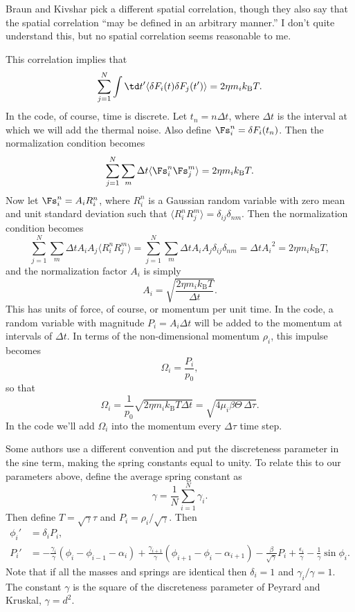 \documentclass[11pt]{article}
\begin{document}
Braun and Kivshar pick a different spatial correlation, though they also say that the spatial correlation ``may be defined in an arbitrary manner.'' I don't quite understand this, but no spatial correlation seems reasonable to me.

This correlation implies that
\[
\sum_{j=1}^N\int \td t' \langle\delta F_i(t)\delta F_j(t')\rangle
	= 2\eta m_ik_\text{B}T.
\]
In the code, of course, time is discrete. Let $t_n=n\Delta t$, where $\Delta t$ is the interval at which we will add the thermal noise. Also define $\Fs_i^n=\delta F_i(t_n)$. Then the normalization condition becomes
\[
\sum_{j=1}^N\sum_m \Delta t\langle \Fs_i^n\Fs_j^{m}\rangle = 2\eta m_ik_\text{B}T.
\]
Now let $\Fs_i^n=A_iR_i^n$, where $R_i^n$ is a Gaussian random variable with zero mean and unit standard deviation such that $\langle R_i^nR_j^m\rangle=\delta_{ij}\delta_{nm}$. Then the normalization condition becomes
\[
\sum_{j=1}^N\sum_m \Delta t A_i A_j\langle R_i^nR_j^m\rangle
	=\sum_{j=1}^N\sum_m \Delta t A_i A_j\delta_{ij}\delta_{nm}
	=\Delta t{A_i}^2
	=2\eta m_ik_\text{B}T,
\]
and the normalization factor $A_i$ is simply
\[
A_i=\sqrt{\frac{2\eta m_ik_\text{B}T}{\Delta t}}.
\]
This has units of force, of course, or momentum per unit time. In the code, a random variable with magnitude $P_i=A_i\Delta t$ will be added to the momentum at intervals of $\Delta t$. In terms of the non-dimensional momentum $\rho_i$, this impulse becomes
\[
\Omega_i=\frac{P_i}{p_0},
\]
so that
\[
\Omega_i=\frac{1}{p_0}\sqrt{2\eta m_ik_\text{B}T \Delta t}
	=\sqrt{4\mu_i\beta\Theta\,\Delta\tau}.
\]
In the code we'll add $\Omega_i$ into the momentum every $\Delta\tau$ time step.

Some authors use a different convention and put the discreteness parameter in the sine term, making the spring constants equal to unity. To relate this to our parameters above, define the average spring constant as
\[
\gamma=\frac{1}{N}\sum_{i=1}^N \gamma_i.
\]
Then define $T=\sqrt{\gamma}\tau$ and $P_i=\rho_i/\sqrt{\gamma}$. Then
\begin{align*}
\phi_i'&=\delta_i P_i,\\
P_i'&=-\frac{\gamma_i}{\gamma}(\phi_i-\phi_{i-1}-\alpha_i)
	+\frac{\gamma_{i+1}}{\gamma}(\phi_{i+1}-\phi_i-\alpha_{i+1})
	-\frac{\beta}{\sqrt{\gamma}}P_i+\frac{\epsilon_i}{\gamma}
	-\frac{1}{\gamma}\sin\phi_i.
\end{align*}
Note that if all the masses and springs are identical then $\delta_i=1$ and $\gamma_i/\gamma=1$. The constant $\gamma$ is the square of the discreteness parameter of Peyrard and Kruskal, $\gamma=d^2$.
\end{document}
